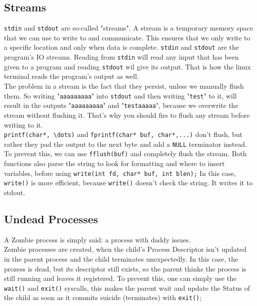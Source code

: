 \documentclass[a4paper, 11pt]{article}
\begin{document}
    \subsection{Streams}
    \texttt{stdin} and \texttt{stdout} are so-called "streams". A stream is a  temporary memory space that we can
    use to write to and communicate. This ensures that we only write to a specific location and only when data is complete. \texttt{stdin} and \texttt{stdout}
    are the program's IO streams. Reading from \texttt{stdin} will read any input that has been given to a program
    and reading \texttt{stdout} wil give its output. That is how the linux terminal reads the program's output as well.\\
    The problem in a stream is the fact that they persist, unless we manually flush them.
    So writing "\texttt{aaaaaaaaa}" into \texttt{stdout} and then writing "\texttt{test}" to it,
    will result in the outputs "\texttt{aaaaaaaaa}" and "\texttt{testaaaaa}", because we overwrite the stream without flushing it.
    That's why you should firs to flush any stream before writing to it.\\
    \lstinline{printf(char*, \dots)} and \lstinline{fprintf(char* buf, char*,...)} don't flush, but rather they pad the output to the next 
    byte and add a \lstinline{NULL} terminator instead. To prevent this, we can use \lstinline{fflush(buf)} and completely flush the stream.
    Both functions also parse the string to look for formatting and where to insert variables, before using \lstinline{write(int fd, char* buf, int blen);} 
    In this case, \texttt{write()} is more efficient, because \texttt{write()} doesn't check the string. It writes it to stdout.
    
    \subsection{Undead Processes}
    A Zombie process is simply said: a process with daddy issues.\\
    Zombie processes are created, when the child's Process Descriptor isn't updated in the parent process and the child terminates unexpectedly.
    In this case, the prozess is dead, but its descriptor still exists, so the parent thinks the process is still running and leaves it registered.
    To prevent this, one can simply use the \texttt{wait()} and \texttt{exit()} syscalls, this makes the parent wait and update the Status of the child
    as soon as it commits suicide (terminates) with \texttt{exit()};
\end{document}
